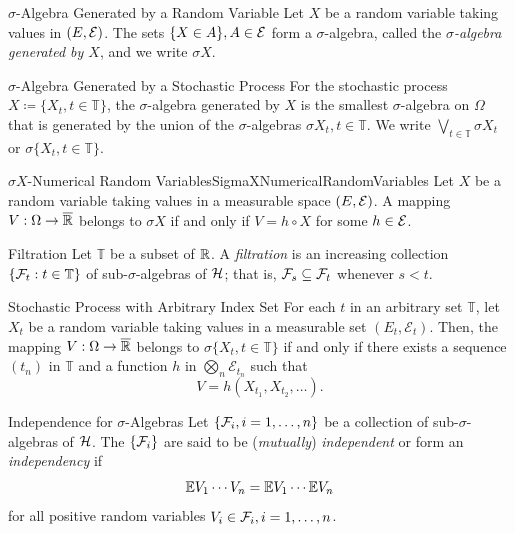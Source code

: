 \begin{defn}{$\sigma$-Algebra Generated by a Random Variable}{}
	Let $X$ be a random variable taking values in $(E, \mathcal{E})$. The sets $\{X \in A\}, A \in \mathcal{E}$ form a $\sigma$-algebra, called the \textit{$\sigma$-algebra generated by $X$}, and we write $\sigma X$.
\end{defn}

\begin{thm}{$\sigma$-Algebra Generated by a Stochastic Process}{}
	For the stochastic process $X \coloneqq \{X_t, t \in \mathbb{T}\}$, the $\sigma$-algebra generated by $X$ is the smallest $\sigma$-algebra on $\Omega$ that is generated by the union of the $\sigma$-algebras $\sigma X_t, t \in \mathbb{T}$. We write $\bigvee_{t \in \mathbb{T}} \sigma X_t$ or $\sigma \{X_t, t \in \mathbb{T}\}$.
\end{thm}

\begin{thm}{$\sigma X$-Numerical Random Variables}{SigmaXNumericalRandomVariables}
	Let $X$ be a random variable taking values in a measurable space $(E, \mathcal{E})$. A mapping $V : \Omega \to \overline{\mathbb{R}}$ belongs to $\sigma X$ if and only if $V = h \circ X$ for some $h \in \mathcal{E}$.
\end{thm}

\begin{defn}{Filtration}{}
	Let $\mathbb{T}$ be a subset of $\mathbb{R}$. A \textit{filtration} is an increasing collection $\{\mathcal{F}_t : t \in \mathbb{T}\}$ of sub-$\sigma$-algebras of $\mathcal{H}$; that is, $\mathcal{F}_s \subseteq \mathcal{F}_t$ whenever $s < t$.
\end{defn}

\begin{thm}{Stochastic Process with Arbitrary Index Set}{}
	For each $t$ in an arbitrary set $\mathbb{T}$, let $X_t$ be a random variable taking values in a measurable set $(E_t, \mathcal{E}_t)$. Then, the mapping $V : \Omega \to \overline{\mathbb{R}}$ belongs to $\sigma\{X_t, t \in \mathbb{T}\}$ if and only if there exists a sequence $(t_n)$ in $\mathbb{T}$ and a function $h$ in $\bigotimes_{n} \mathcal{E}_{t_n}$ such that
	\begin{equation*}
		V = h(X_{t_1}, X_{t_2}, \dots).
	\end{equation*}
\end{thm}

\begin{defn}{Independence for $\sigma$-Algebras}{}
	Let $\{\mathcal{F}_i, i = 1, \dots, n\}$ be a collection of sub-$\sigma$-algebras of $\mathcal{H}$. The $\{\mathcal{F}_i\}$ are said to be (\textit{mutually}) \textit{independent} or form an \textit{independency} if
	\begin{equation}
		\mathbb{E} V_1 \cdots V_n = \mathbb{E} V_1 \cdots \mathbb{E} V_n
		\label{eq:SigmaAlgebraIndependenceDef}
	\end{equation}
	for all positive random variables $V_i \in \mathcal{F}_i, i = 1, \dots, n$.
\end{defn}

